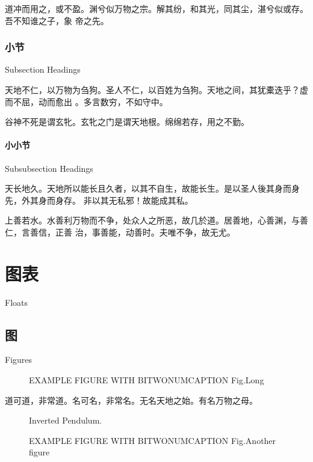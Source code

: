 \documentclass[a4paper, twoside, openany, extrafontsizes]{dlutthesis}
\begin{document}
道冲而用之，或不盈。渊兮似万物之宗。解其纷，和其光，同其尘，湛兮似或存。吾不知谁之子，象
帝之先。

\subsection{小节}{Subsection Headings}
\label{sub:subsection}

天地不仁，以万物为刍狗。圣人不仁，以百姓为刍狗。天地之间，其犹橐迭乎？虚而不屈，动而愈出
。多言数穷，不如守中。

谷神不死是谓玄牝。玄牝之门是谓天地根。绵绵若存，用之不勤。

\subsubsection{小小节}{Subsubsection Headings}
\label{subs:subsubsection}

天长地久。天地所以能长且久者，以其不自生，故能长生。是以圣人後其身而身先，外其身而身存。
非以其无私邪！故能成其私。

上善若水。水善利万物而不争，处众人之所恶，故几於道。居善地，心善渊，与善仁，言善信，正善
治，事善能，动善时。夫唯不争，故无尤。

\chapter{图表}{Floats}
\label{chap:floats}

\section{图}{Figures}
\label{sec:figures}

\begin{figure}[htp]
	\centering
	EXAMPLE FIGURE WITH BITWONUMCAPTION
		{Fig.}{Long }
\end{figure}

道可道，非常道。名可名，非常名。无名天地之始。有名万物之母。

\begin{figure}[h]
	\centering
	
	\caption{Inverted Pendulum.}
	\label{fig:IP}
\end{figure}
\begin{figure}[h]
	\centering
	EXAMPLE FIGURE WITH BITWONUMCAPTION
		{Fig.}{Another figure}
\end{figure}
\end{document}
